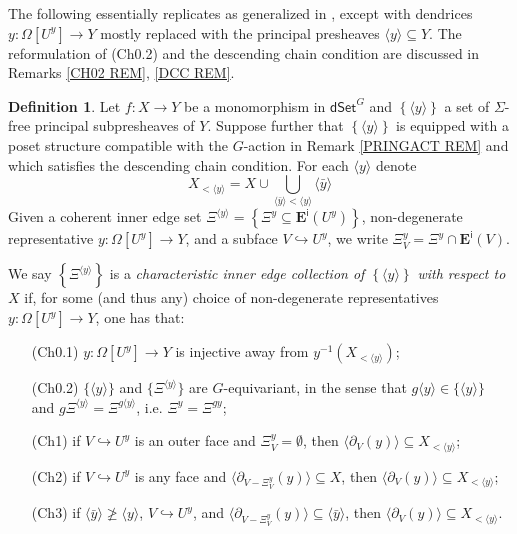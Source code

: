 \documentclass[a4paper,10pt
,draft
]{article}%
\numberwithin{equation}{section}
\numberwithin{figure}{section}
\theoremstyle{definition} %
\newtheorem{definition}[equation]{Definition}%
\newcommand{\1}{\ensuremath{\mathbbm 1}}%
\begin{document}
The following essentially replicates \cite[Def. 3.1]{BP_edss} as generalized in \cite[Rem. 3.7]{BP_edss},
except with dendrices
$y \colon \Omega[U^y] \to Y$
mostly replaced with the principal presheaves
$\langle y \rangle \subseteq Y$. 
The reformulation of (Ch0.2) and the descending chain condition
are discussed in Remarks \ref{CH02 REM}, \ref{DCC REM}.

\begin{definition}\label{CHAREDGE DEF}
	Let $f\colon X \to Y$ be a monomorphism in 
	$\mathsf{dSet}^G$ and 
	$\left\{ \langle y \rangle\right\}$
	a set of $\Sigma$-free principal subpresheaves of $Y$. 
	Suppose further that 
	$\left\{ \langle y \rangle \right\}$ is equipped 
	with a poset structure compatible with the $G$-action
	in Remark \ref{PRINGACT REM}
	and which satisfies the descending chain condition.
	For each $\langle y \rangle$ denote
	\[
	X_{< \langle y \rangle} = X \cup 
	\bigcup_{\langle\bar{y}\rangle < \langle y \rangle} \langle \bar{y} \rangle
	\]
	Given a coherent inner edge set 
	$
	\Xi^{\langle y \rangle} =
	\left\{ \Xi^y \subseteq \boldsymbol{E}^{\mathsf{i}}(U^y)\right\}$,
	non-degenerate representative
	$y \colon \Omega[U^y] \to Y$, and a subface $V \hookrightarrow U^y$,
	we write
	$\Xi^y_V = \Xi^y \cap \boldsymbol{E}^{\mathsf{i}}(V)$.
	
	We say
	$
	\left\{ \Xi^{\langle y \rangle} \right \} 
	$
	is a \emph{characteristic inner edge collection 
	of $\left\{ \langle y \rangle \right\}$ with respect to $X$} if,
	for some (and thus any) choice of non-degenerate representatives $y\colon \Omega[U^y] \to Y$,
	one has that:
	\begin{enumerate}
		\item[(Ch0.1)] $y \colon \Omega[U^y] \to Y$ is injective away from
		$y^{-1}\left( X_{< \langle y \rangle} \right)$; 
		\item[(Ch0.2)]
		$\{\langle y\rangle\}$ and
		$\{\Xi^{\langle y \rangle}\}$ are $G$-equivariant, in the sense that
		$g\langle y\rangle \in \{\langle y\rangle\}$ and 
		$g \Xi^{\langle y \rangle} =
		\Xi^{g \langle y \rangle}$,
		i.e. $\Xi^y = \Xi^{gy}$;
		\item[(Ch1)] if $V \hookrightarrow U^y$ is an outer face and $\Xi^y_V = \emptyset$,
		then $\langle \partial_V (y) \rangle \subseteq X_{< \langle y \rangle}$;
		\item[(Ch2)] if $V \hookrightarrow U^y$ is any face and
		$\langle \partial_{V-\Xi^y_V} (y)\rangle \subseteq X$,
		then
		$\langle \partial_V (y)\rangle \subseteq X_{< \langle y \rangle}$;
		\item[(Ch3)] if $\langle \bar{y} \rangle \not \geq \langle y \rangle$,
		$V \hookrightarrow U^y$,
		and
		$\langle \partial_{V-\Xi^y_V} (y)\rangle \subseteq \langle \bar{y} \rangle$,
		then
		$\langle \partial_V (y)\rangle \subseteq X_{< \langle y \rangle}$.
	\end{enumerate}
\end{definition}
\end{document}

